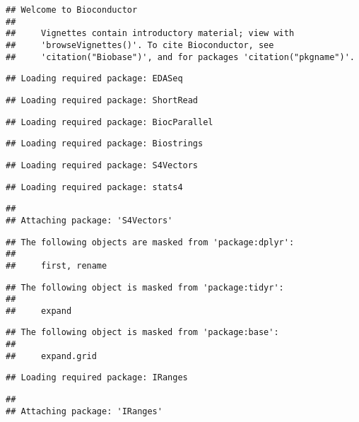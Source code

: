 \documentclass[]{article}
\begin{document}
\begin{verbatim}
## Welcome to Bioconductor
## 
##     Vignettes contain introductory material; view with
##     'browseVignettes()'. To cite Bioconductor, see
##     'citation("Biobase")', and for packages 'citation("pkgname")'.
\end{verbatim}

\begin{verbatim}
## Loading required package: EDASeq
\end{verbatim}

\begin{verbatim}
## Loading required package: ShortRead
\end{verbatim}

\begin{verbatim}
## Loading required package: BiocParallel
\end{verbatim}

\begin{verbatim}
## Loading required package: Biostrings
\end{verbatim}

\begin{verbatim}
## Loading required package: S4Vectors
\end{verbatim}

\begin{verbatim}
## Loading required package: stats4
\end{verbatim}

\begin{verbatim}
## 
## Attaching package: 'S4Vectors'
\end{verbatim}

\begin{verbatim}
## The following objects are masked from 'package:dplyr':
## 
##     first, rename
\end{verbatim}

\begin{verbatim}
## The following object is masked from 'package:tidyr':
## 
##     expand
\end{verbatim}

\begin{verbatim}
## The following object is masked from 'package:base':
## 
##     expand.grid
\end{verbatim}

\begin{verbatim}
## Loading required package: IRanges
\end{verbatim}

\begin{verbatim}
## 
## Attaching package: 'IRanges'
\end{verbatim}
\end{document}
